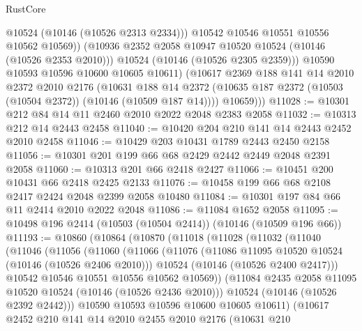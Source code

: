 \begin{lexlean}{RustCore}
\begin{coremodule}
                  @10524
                  (@10146 (@10526 @2313 @2334)))
                @10542
                @10546
                @10551
                @10556
                @10562
                @10569))
            (@10936 @2352 @2058 @10947 @10520 @10524 (@10146 (@10526 @2353 @2010)))
            @10524
            (@10146 (@10526 @2305 @2359)))
          @10590
          @10593
          @10596
          @10600
          @10605
          @10611)
        (@10617
          @2369
          @188
          @141
          @14
          @2010
          @2372
          @2010
          @2176
          (@10631
            @188
            @14
            @2372
            (@10635 @187 @2372 (@10503 (@10504 @2372)) (@10146 (@10509 @187 @14))))
          @10659)))
@11028 := @10301 @212 @84 @14 @11 @2460 @2010 @2022 @2048 @2383 @2058
@11032 := @10313 @212 @14 @2443 @2458
@11040 := @10420 @204 @210 @141 @14 @2443 @2452 @2010 @2458
@11046 := @10429 @203 @10431 @1789 @2443 @2450 @2158
@11056 := @10301 @201 @199 @66 @68 @2429 @2442 @2449 @2048 @2391 @2058
@11060 := @10313 @201 @66 @2418 @2427
@11066 := @10451 @200 @10431 @66 @2418 @2425 @2133
@11076 := @10458 @199 @66 @68 @2108 @2417 @2424 @2048 @2399 @2058 @10480
@11084 := @10301 @197 @84 @66 @11 @2414 @2010 @2022 @2048
@11086 := @11084 @1652 @2058
@11095 := @10498 @196 @2414 (@10503 (@10504 @2414)) (@10146 (@10509 @196 @66))
@11193 := @10860
    (@10864
      (@10870
        (@11018
          (@11028
            (@11032
              (@11040
                (@11046
                  (@11056
                    (@11060
                      (@11066
                        (@11076
                          (@11086 @11095 @10520 @10524 (@10146 (@10526 @2406 @2010)))
                          @10524
                          (@10146 (@10526 @2400 @2417)))
                        @10542
                        @10546
                        @10551
                        @10556
                        @10562
                        @10569))
                    (@11084 @2435 @2058 @11095 @10520 @10524 (@10146 (@10526 @2436 @2010)))
                    @10524
                    (@10146 (@10526 @2392 @2442)))
                  @10590
                  @10593
                  @10596
                  @10600
                  @10605
                  @10611)
                (@10617
                  @2452
                  @210
                  @141
                  @14
                  @2010
                  @2455
                  @2010
                  @2176
                  (@10631
                    @210

\end{coremodule}
\end{lexlean}
